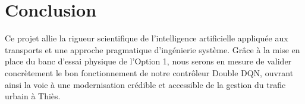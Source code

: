 \documentclass[11pt,a4paper]{article}
\begin{document}
\section{Conclusion}

Ce projet allie la rigueur scientifique de l'intelligence artificielle appliquée aux transports et une approche pragmatique d'ingénierie système. Grâce à la mise en place du banc d'essai physique de l'Option 1, nous serons en mesure de valider concrètement le bon fonctionnement de notre contrôleur Double DQN, ouvrant ainsi la voie à une modernisation crédible et accessible de la gestion du trafic urbain à Thiès.
\end{document}
